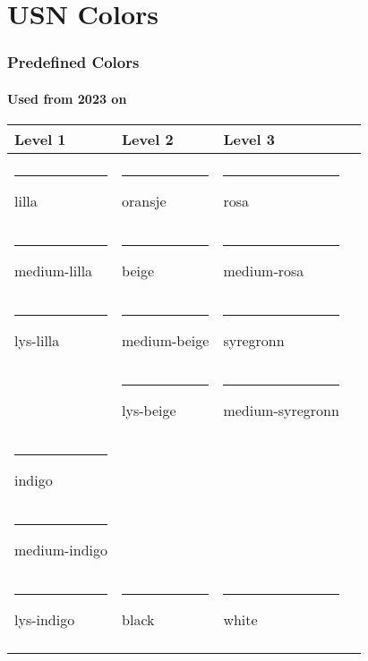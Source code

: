 \documentclass[american,aspectratio=169]{beamer}
\begin{document}
\section{USN Colors}

\begin{frame}

\frametitle{Predefined Colors}
\framesubtitle{Used from 2023 on}
\centering

\begin{tabular}{llll}
  Level 1                                              & Level 2                                            & Level 3                                                    \\
  \hline                                                                                                                                                                 \\
  {\color{lilla}\rule{3em}{2ex}} lilla                 & {\color{oransje}\rule{3em}{2ex}} oransje           & {\color{rosa}\rule{3em}{2ex}} rosa                         \\
  {\color{medium-lilla}\rule{3em}{2ex}} medium-lilla   & {\color{beige}\rule{3em}{2ex}} beige               & {\color{medium-rosa}\rule{3em}{2ex}} medium-rosa           \\
  {\color{lys-lilla}\rule{3em}{2ex}} lys-lilla         & {\color{medium-beige}\rule{3em}{2ex}} medium-beige & {\color{syregronn}\rule{3em}{2ex}} syregronn               \\
                                                       & {\color{lys-beige}\rule{3em}{2ex}} lys-beige       & {\color{medium-syregronn}\rule{3em}{2ex}} medium-syregronn \\
  {\color{indigo}\rule{3em}{2ex}} indigo               &                                                    &                                                            \\
  {\color{medium-indigo}\rule{3em}{2ex}} medium-indigo &                                                    &                                                            \\
  {\color{lys-indigo}\rule{3em}{2ex}} lys-indigo       & {\color{black}\rule{3em}{2ex}} black               & {\color{white}\rule{3em}{2ex}} white                       \\
  \hline                                                                                                                                                                 \\
\end{tabular}

\end{frame}
\end{document}
